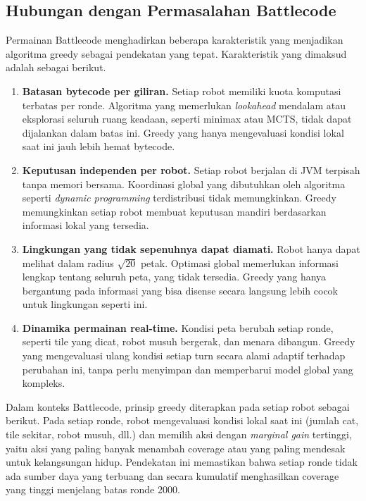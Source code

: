 \subsection{Hubungan dengan Permasalahan Battlecode}

Permainan Battlecode menghadirkan beberapa karakteristik yang menjadikan algoritma greedy sebagai pendekatan yang tepat. Karakteristik yang dimaksud adalah sebagai berikut.

\begin{enumerate}
  \item \textbf{Batasan bytecode per giliran.} Setiap robot memiliki kuota komputasi terbatas per ronde. Algoritma yang memerlukan \textit{lookahead} mendalam atau eksplorasi seluruh ruang keadaan, seperti minimax atau MCTS, tidak dapat dijalankan dalam batas ini. Greedy yang hanya mengevaluasi kondisi lokal saat ini jauh lebih hemat bytecode.

  \item \textbf{Keputusan independen per robot.} Setiap robot berjalan di JVM terpisah tanpa memori bersama. Koordinasi global yang dibutuhkan oleh algoritma seperti \textit{dynamic programming} terdistribusi tidak memungkinkan. Greedy memungkinkan setiap robot membuat keputusan mandiri berdasarkan informasi lokal yang tersedia.

  \item \textbf{Lingkungan yang tidak sepenuhnya dapat diamati.} Robot hanya dapat melihat dalam radius $\sqrt{20}$ petak. Optimasi global memerlukan informasi lengkap tentang seluruh peta, yang tidak tersedia. Greedy yang hanya bergantung pada informasi yang bisa disense secara langsung lebih cocok untuk lingkungan seperti ini.

  \item \textbf{Dinamika permainan real-time.} Kondisi peta berubah setiap ronde, seperti tile yang dicat, robot musuh bergerak, dan menara dibangun. Greedy yang mengevaluasi ulang kondisi setiap turn secara alami adaptif terhadap perubahan ini, tanpa perlu menyimpan dan memperbarui model global yang kompleks.
\end{enumerate}

Dalam konteks Battlecode, prinsip greedy diterapkan pada setiap robot sebagai berikut. Pada setiap ronde, robot mengevaluasi kondisi lokal saat ini (jumlah cat, tile sekitar, robot musuh, dll.) dan memilih aksi dengan \textit{marginal gain} tertinggi, yaitu aksi yang paling banyak menambah coverage atau yang paling mendesak untuk kelangsungan hidup. Pendekatan ini memastikan bahwa setiap ronde tidak ada sumber daya yang terbuang dan secara kumulatif menghasilkan coverage yang tinggi menjelang batas ronde 2000.

